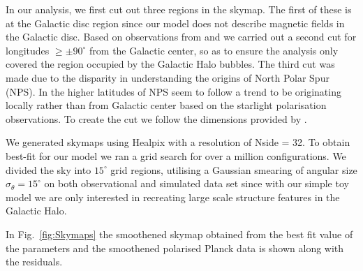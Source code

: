 \documentclass[12pt, a4 paper]{article}
\begin{document}
In our analysis, we first cut out three regions in the skymap. The first of these is at the Galactic disc region since our model does not describe magnetic fields in the Galactic disc. Based on observations from \cite{eROSITA} and \cite{Su_2010} we carried out a second cut for longitudes  $\geq \pm 90^{\circ}$ from the Galactic center, so as to ensure the analysis only covered the region occupied by the Galactic Halo bubbles.
The third cut was made due to the disparity in understanding the origins of North Polar Spur (NPS). In \cite{Gina_2021} the higher latitudes of NPS seem to follow a trend to be originating locally rather than from Galactic center based on the starlight polarisation observations. To create the cut we follow the dimensions provided by \cite{Wolleben_2007}.

We generated skymaps using Healpix with a resolution of Nside = 32. To obtain best-fit for our model we ran a grid search for over a million configurations. We divided the sky into $15^{\circ}$ grid regions, utilising a Gaussian smearing of angular size $\sigma_{\theta}=15^{\circ}$ on both observational and simulated data set since with our simple toy model we are only interested in recreating large scale structure features in the Galactic Halo. 

In Fig.~\ref{fig:Skymaps} the smoothened skymap obtained from the best fit value of the parameters and the smoothened polarised Planck data is shown along with the residuals. 
\end{document}
